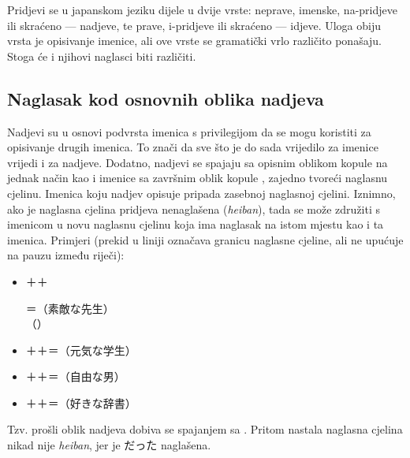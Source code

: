 Pridjevi se u japanskom jeziku dijele u dvije vrste: neprave, imenske, na-pridjeve ili skraćeno --- nadjeve, te prave, i-pridjeve ili skraćeno --- idjeve.
Uloga obiju vrsta je opisivanje imenice, ali ove vrste se gramatički vrlo različito ponašaju.
Stoga će i njihovi naglasci biti različiti.

\subsection{Naglasak kod osnovnih oblika nadjeva}
Nadjevi su u osnovi podvrsta imenica s privilegijom da se mogu koristiti za opisivanje drugih imenica.
To znači da sve što je do sada vrijedilo za imenice vrijedi i za nadjeve.
Dodatno, nadjevi se spajaju sa opisnim oblikom kopule  na jednak način kao i imenice sa završnim oblik kopule , zajedno tvoreći naglasnu cjelinu.
Imenica koju nadjev opisuje pripada zasebnoj naglasnoj cjelini.
Iznimno, ako je naglasna cjelina pridjeva nenaglašena (\textit{heiban}), tada se može združiti s imenicom u novu naglasnu cjelinu koja ima naglasak na istom mjestu kao i ta imenica.
Primjeri (prekid u liniji označava granicu naglasne cjeline, ali ne upućuje na pauzu između riječi):
\begin{itemize}
	\item {}＋＋%
	\begin{minipage}[t]{8cm}
		＝\!（素敵な先生）\\
		\hspace*{0em}（）
	\end{minipage}
	\item {}＋＋＝\!（元気な学生）
	\item {}＋＋＝\!（自由な男）
	\item {}＋＋＝\!（好きな辞書）
\end{itemize}

Tzv. prošli oblik nadjeva dobiva se spajanjem sa .
Pritom nastala naglasna cjelina nikad nije \textit{heiban}, jer je だった naglašena.

